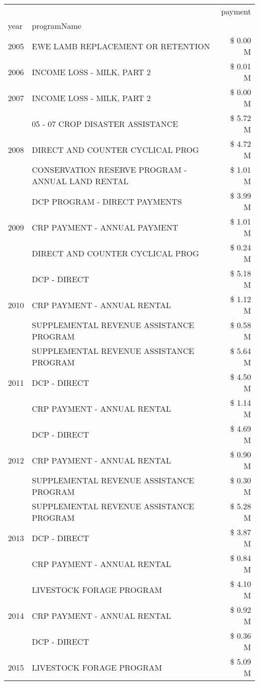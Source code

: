 \begin{tabular}{llr}
\toprule
 &  & payment \\
year & programName &  \\
\midrule
2005 & EWE LAMB REPLACEMENT OR RETENTION & \$ 0.00 M \\
\cline{1-3}
2006 & INCOME LOSS - MILK, PART 2 & \$ 0.01 M \\
\cline{1-3}
2007 & INCOME LOSS - MILK, PART 2 & \$ 0.00 M \\
\cline{1-3}
\multirow[t]{3}{*}{2008} & 05 - 07 CROP DISASTER ASSISTANCE & \$ 5.72 M \\
 & DIRECT AND COUNTER CYCLICAL PROG & \$ 4.72 M \\
 & CONSERVATION RESERVE PROGRAM - ANNUAL LAND RENTAL & \$ 1.01 M \\
\cline{1-3}
\multirow[t]{3}{*}{2009} & DCP PROGRAM - DIRECT PAYMENTS & \$ 3.99 M \\
 & CRP PAYMENT - ANNUAL PAYMENT & \$ 1.01 M \\
 & DIRECT AND COUNTER CYCLICAL PROG & \$ 0.24 M \\
\cline{1-3}
\multirow[t]{3}{*}{2010} & DCP - DIRECT & \$ 5.18 M \\
 & CRP PAYMENT - ANNUAL RENTAL & \$ 1.12 M \\
 & SUPPLEMENTAL REVENUE ASSISTANCE PROGRAM & \$ 0.58 M \\
\cline{1-3}
\multirow[t]{3}{*}{2011} & SUPPLEMENTAL REVENUE ASSISTANCE PROGRAM & \$ 5.64 M \\
 & DCP - DIRECT & \$ 4.50 M \\
 & CRP PAYMENT - ANNUAL RENTAL & \$ 1.14 M \\
\cline{1-3}
\multirow[t]{3}{*}{2012} & DCP - DIRECT & \$ 4.69 M \\
 & CRP PAYMENT - ANNUAL RENTAL & \$ 0.90 M \\
 & SUPPLEMENTAL REVENUE ASSISTANCE PROGRAM & \$ 0.30 M \\
\cline{1-3}
\multirow[t]{3}{*}{2013} & SUPPLEMENTAL REVENUE ASSISTANCE PROGRAM & \$ 5.28 M \\
 & DCP - DIRECT & \$ 3.87 M \\
 & CRP PAYMENT - ANNUAL RENTAL & \$ 0.84 M \\
\cline{1-3}
\multirow[t]{3}{*}{2014} & LIVESTOCK FORAGE PROGRAM & \$ 4.10 M \\
 & CRP PAYMENT - ANNUAL RENTAL & \$ 0.92 M \\
 & DCP - DIRECT & \$ 0.36 M \\
\cline{1-3}
\multirow[t]{3}{*}{2015} & LIVESTOCK FORAGE PROGRAM & \$ 5.09 M \\

\end{tabular}
